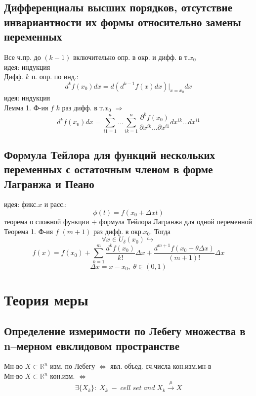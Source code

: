 \documentclass{article}
\begin{document}
\subsection{Дифференциалы высших порядков, отсутствие инвариантности их формы относительно замены переменных}
Все ч.пр. до $(k-1)$ включительно опр. в окр. и дифф. в т.$x_0$ \\
идея: индукция \\
Дифф. $k$ п. опр. по инд.:
\begin{equation*}
    d^k f(x_0) dx = d(d^{k-1} f(x) dx) \bigg |_{x=x_0} dx
\end{equation*}
идея: индукция \\
Лемма 1. Ф-ия $f$ $k$  раз дифф. в т.$x_0$ $\Rightarrow$
\begin{equation*}
    d^k f(x_0) dx = \sum_{i1=1}^n ... \sum_{ik=1}^n \frac{\partial ^k f(x_0)}{\partial x^{ik} ... \partial x^{i1}} dx^{ik} ... dx^{i1}
\end{equation*}
\subsection{Формула Тейлора для функций нескольких переменных с остаточным членом в форме Лагранжа и Пеано}
идея: фикс.$x$ и расс.: \\
\begin{equation*}
    \phi (t) = f(x_0+ \Delta x t)
\end{equation*}
теорема о сложной функции + формула Тейлора Лагранжа для одной переменной \\
Теорема 1. Ф-ия $f$ $(m+1)$ раз дифф. в окр.$x_0$. Тогда
\begin{equation*}
    \forall x \in U_\delta(x_0) \hookrightarrow
\end{equation*}
\begin{equation*}
    f(x) = f(x_0) + \sum_{k=1}^{m} \frac{d^k f(x_0)}{k!} \Delta x + \frac{d^{m+1} f(x_0+ \theta \Delta x)}{(m+1)!} \Delta x
\end{equation*}
\begin{equation*}
    \Delta x = x - x_0, \; \theta \in (0, 1)
\end{equation*}


\newpage
\section{Теория меры}
\subsection{Определение измеримости по Лебегу множества в n–мерном евклидовом пространстве}
Мн-во $X \subset \mathbb R^n$ изм. по Лебегу $\Leftrightarrow$ явл. объед. сч.числа кон.изм.мн-в \\
Мн-во $X \subset \mathbb R^n$ кон.изм. $\Leftrightarrow$
\begin{equation*}
    \exists \{ X_k \}: \; X_k \; - \; cell \; set \; and \; X_k \overset{\mu}{\rightarrow} X
\end{equation*}
\end{document}
